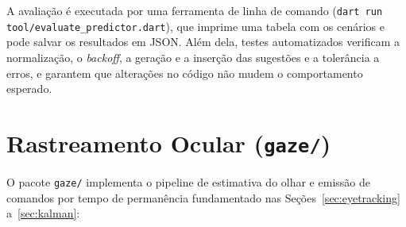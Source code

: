 A avaliação é executada por uma ferramenta de linha de comando (\texttt{dart run tool/\allowbreak evaluate\_\allowbreak predictor.dart}), que imprime uma tabela com os cenários e pode salvar os resultados em JSON. Além dela, testes automatizados verificam a normalização, o \textit{backoff}, a geração e a inserção das sugestões e a tolerância a erros, e garantem que alterações no código não mudem o comportamento esperado.

\section{Rastreamento Ocular (\texttt{gaze/})} \label{sec:met_eyetracking}

O pacote \texttt{gaze/} implementa o pipeline de estimativa do olhar e emissão de comandos por tempo de permanência fundamentado nas Seções~\ref{sec:eyetracking} a~\ref{sec:kalman}:

